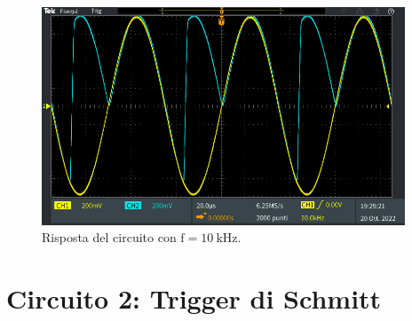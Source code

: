 \documentclass{report}
\begin{document}
\begin{figure}[h!]
	\centering
	\includegraphics[height=6.5cm]{immagini/TEK00008}
	\caption{Risposta del circuito con $\mathrm{f= \SI{10}{k\hertz}}$.}
	\label{figura:uscita12}
\end{figure}
\newpage
\section{Circuito 2: Trigger di Schmitt}
\end{document}
